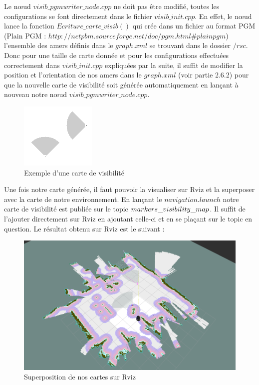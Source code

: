 \documentclass[10pt,a4paper]{article}
\begin{document}
Le nœud $visib\_pgmwriter\_node.cpp$ ne doit pas être modifié, toutes les configurations se font directement dans le fichier $visib\_init.cpp$. En effet, le nœud lance la fonction $Ecriture\_carte\_visib()$ qui crée dans un fichier au format PGM (Plain PGM : $http://netpbm.sourceforge.net/doc/pgm.html\#plainpgm$) l'ensemble des amers définis dans le $graph.xml$ se trouvant dans le dossier $/rsc$. Donc pour une taille de carte donnée et pour les configurations effectuées correctement dans $visib\_init.cpp$  expliquées par la suite, il suffit de modifier la position et l'orientation de nos amers dans le $graph.xml$ (voir partie 2.6.2) pour que la nouvelle carte de visibilité soit générée automatiquement en lançant à nouveau notre nœud $visib\_pgmwriter\_node.cpp$.\\

\begin{figure}[!h]
\center
\includegraphics{figures/visib.png} 
\caption{Exemple d'une carte de visibilité}	
\end{figure}

Une fois notre carte générée, il faut pouvoir la visualiser sur Rviz et la superposer avec la carte de notre environnement. En lançant le $navigation.launch$ notre carte de visibilité est publiée sur le topic $\/markers\_visibility\_map$. Il suffit de l'ajouter directement sur Rviz en ajoutant celle-ci et en se plaçant sur le topic en question. Le résultat obtenu sur Rviz est le suivant :

\begin{figure}[!h]
\center
\includegraphics[scale=0.4]{figures/visib_rviz.png} 
\caption{Superposition de nos cartes sur Rviz}	
\end{figure}
\end{document}
